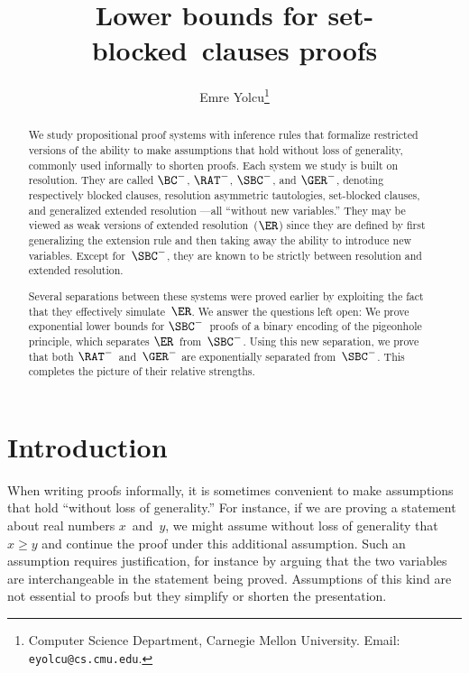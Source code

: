 \documentclass[12pt]{article}
\title{Lower bounds for set-blocked~clauses proofs}
\author{
  Emre Yolcu\thanks{
    Computer Science Department, Carnegie Mellon University.
    Email: \texttt{eyolcu@cs.cmu.edu}.
  }
}
\date{}
\begin{document}
\maketitle

\begin{abstract}
  We study propositional proof systems with inference rules
  that formalize restricted versions of the ability
  to make assumptions that hold without loss of generality,
  commonly used informally to shorten proofs.
  Each system we study is built on resolution.
  They are called $\BC^-$, $\RAT^-$, $\SBC^-$, and $\GER^-$, denoting respectively
  blocked clauses, resolution asymmetric tautologies,
  set-blocked clauses, and generalized extended resolution%
  ---all ``without new variables.''
  They may be viewed as weak versions of extended resolution~($\ER$)
  since they are defined by first generalizing the extension rule
  and then taking away the ability to introduce new variables.
  Except for~$\SBC^-$, they are known to be
  strictly between resolution and extended resolution.

  Several separations between these systems were proved earlier
  by exploiting the fact that they effectively simulate~$\ER$.
  We answer the questions left open:
  We prove exponential lower bounds for $\SBC^-$~proofs
  of a binary encoding of the pigeonhole principle,
  which separates $\ER$~from~$\SBC^-$.
  Using this new separation, we prove that both $\RAT^-$~and~$\GER^-$
  are exponentially separated from~$\SBC^-$.
  This completes the picture of their relative strengths.
\end{abstract}

\section{Introduction}
\label{sec:introduction}

When writing proofs informally, it is sometimes convenient
to make assumptions that hold ``without loss of generality.''
For instance, if we are proving a statement about real numbers $x$~and~$y$,
we might assume without loss of generality that $x \geq y$
and continue the proof under this additional assumption.
Such an assumption requires justification,
for instance by arguing that the two variables are
interchangeable in the statement being proved.
Assumptions of this kind are not essential to proofs
but they simplify or shorten the presentation.
\end{document}
